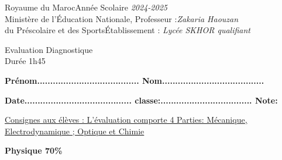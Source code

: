 \documentclass[12pt]{article}
\newcommand\headerMe[2]{\noindent{}#1\hfill#2}
\begin{document}
\headerMe{Royaume du Maroc}{Année Scolaire \emph{2024-2025}}\\
\headerMe{Ministère de l'Éducation Nationale, }{  Professeur :\emph{Zakaria Haouzan}}\\
\headerMe{du Préscolaire et des Sports}{Établissement : \emph{Lycée SKHOR qualifiant}}\\
\begin{center}
	\vspace{-0.5cm}
Evaluation Diagnostique \\
Durée 1h45
\\
\end{center}
\begin{center}
	\vspace{-0.2cm}
	\textbf{ Prénom.......................................  Nom.......................................}
	
	\vspace{0.5cm}
	\textbf{ Date.........................................  classe:................................... Note: }
		


\end{center}
\begin{center}

	\vspace{-0.75cm}
\underline{Consignes aux élèves : L’évaluation comporte 4 Parties: Mécanique, Electrodynamique ; Optique et Chimie}

	\hrulefill
\textbf{Physique 70\%}
\hrulefill
\end{center}
\end{document}

